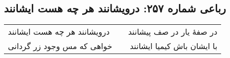 \begin{center}
\section*{رباعی شماره ۲۵۷: درویشانند هر چه هست ایشانند}
\label{sec:sh257}
\begin{longtable}{l p{0.5cm} r}
درویشانند هر چه هست ایشانند
&&
در صفهٔ یار در صف پیشانند
\\
خواهی که مس وجود زر گردانی
&&
با ایشان باش کیمیا ایشانند
\\
\end{longtable}
\end{center}
